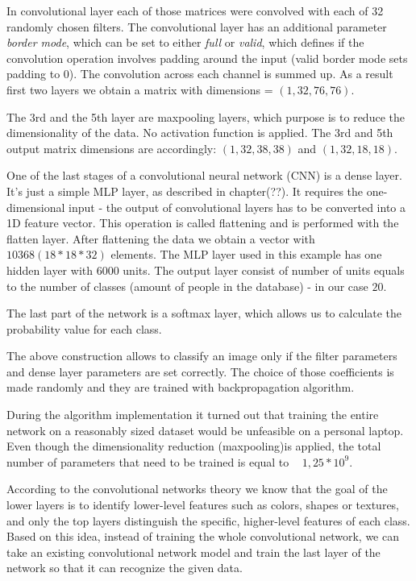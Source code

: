 In convolutional layer each of those matrices were convolved with each of 32 randomly chosen filters. The convolutional layer has an additional parameter \textit{border mode}, which can be set to either \textit{full} or \textit{valid}, which defines if the convolution operation involves padding around the input (valid border mode sets padding to $0$).
The convolution across each channel is summed up. As a result first two layers we obtain a matrix with dimensions = $(1, 32, 76, 76)$.


The 3rd and the 5th layer are maxpooling layers, which purpose is to reduce the dimensionality of the data. No activation function is applied. The 3rd and 5th output matrix dimensions are accordingly: $(1, 32, 38, 38)$ and $(1, 32, 18, 18)$.

One of the last stages of a convolutional neural network (CNN) is a dense layer. It's just a simple MLP layer, as described in chapter(??). It requires the one-dimensional input - the output of convolutional layers has to be converted into a 1D feature vector. This operation is called flattening and is performed with the flatten layer. 
After flattening the data we obtain a vector with $10368 (18*18*32)$ elements. The MLP layer used in this example has one hidden layer with $6000$ units. The output layer consist of number of units equals to the number of classes (amount of people in the database) - in our case $20$. 

The last part of the network is a softmax layer, which allows us to calculate the probability value for each class.

The above construction allows to classify an image only if the filter parameters and dense layer parameters are set correctly. The choice of those coefficients is made randomly and they are trained with backpropagation algorithm. 

During the algorithm implementation it turned out that training the entire network on a reasonably sized dataset would be unfeasible on a personal laptop. Even though the dimensionality reduction (maxpooling)is applied, the total number of parameters that need to be trained is equal to ~ $1,25*10^9$. 

According to the convolutional networks theory we know that the goal of the lower layers is to identify lower-level features such as colors, shapes or textures, and only the top layers distinguish the specific, higher-level features of each class. Based on this idea, instead of training the whole convolutional network, we can take an existing convolutional network model and train the last layer of the network so that it can recognize the given data. 

